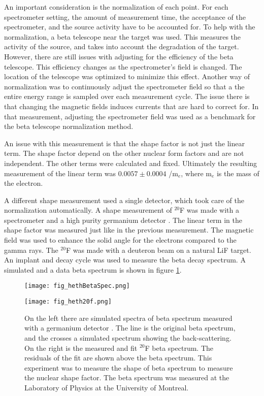 \documentclass[../MaxHughesThesis.tex]{subfiles}
\begin{document}
An important consideration is the normalization of each point.
For each spectrometer setting, the amount of measurement time, the acceptance of the spectrometer, and the source activity have to be accounted for.
To help with the normalization, a beta telescope near the target was used.
This measures the activity of the source, and takes into account the degradation of the target.
However, there are still issues with adjusting for the efficiency of the beta telescope.
This efficiency changes as the spectrometer's field is changed.
The location of the telescope was optimized to minimize this effect.
Another way of normalization was to continuously adjust the spectrometer field so that a the entire energy range is sampled over each measurement cycle.
The issue there is that changing the magnetic fields induces currents that are hard to correct for. 
In that measurement, adjusting the spectrometer field was used as a benchmark for the beta telescope normalization method.

An issue with this measurement is that the shape factor is not just the linear term.
The shape factor depend on the other nuclear form factors and are not independent.
The other terms were calculated and fixed.
Ultimately the resulting measurement of the linear term was $0.0057 \pm 0.0004 $ /m$_{e}$, where m$_{e}$ is the mass of the electron.

A different shape measurement used  a single detector, which took care of the normalization automatically. 
A shape measurement of $^{20}$F was made with a spectrometer and a high purity germanium detector \cite{Het89}.
The linear term in the shape factor was measured just like in the previous measurement.
The magnetic field was used to enhance the solid angle for the electrons compared to the gamma rays.
The $^{20}$F was made with a deuteron beam on a natural LiF target. 
An implant and decay cycle was used to measure the beta decay spectrum. 
A simulated and a data beta spectrum is shown in figure \ref{fig:hethspec}.

\begin{figure}[!htb]
	\begin{minipage}[b][][b]{0.50\textwidth}
		\centerline{\texttt{[image: fig\_hethBetaSpec.png]}}
	\end{minipage}\hfill
	\begin{minipage}[b][][b]{0.50\textwidth}
		\centerline{\texttt{[image: fig\_heth20f.png]}}
	\end{minipage}
	\caption{On the left there are simulated spectra of beta spectrum measured with a germanium detector \cite{Het89}.
		 The line is the original beta spectrum, and the crosses a simulated spectrum showing the back-scattering.
		 On the right is the measured and fit $^{20}$F beta spectrum.
		 The residuals of the fit are shown above the beta spectrum.
		 This experiment was to measure the shape of beta spectrum to measure the nuclear shape factor.
		 The beta spectrum was measured at the Laboratory of Physics at the University of Montreal. }
	\label{fig:hethspec}
\end{figure}
\end{document}

